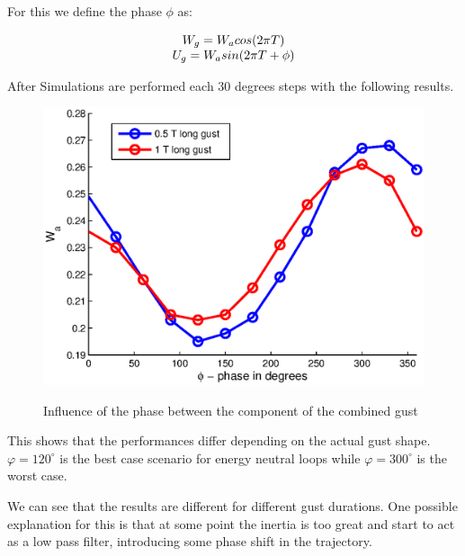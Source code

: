 \par For this we define the phase $\phi$ as:

\begin{equation}
  \begin{array}[c]{c}
    W_g=W_a cos(2\pi T) \\
    U_g=W_a sin(2\pi T + \phi)
  \end{array}
  \label{eqn:combined_gust_phase}
\end{equation}

After Simulations are performed each 30 degrees steps with the following results.

\begin{figure}[ht]
  \begin{center}
    \scalebox{1.0}
    {\includegraphics{./Figures/combined_gust_amplitude_vs_phase_LUT.eps}}
  \end{center}
  \caption{Influence of the phase between the component of the combined gust}
  \label{fig:combined_amplitude_phase}
\end{figure}

\par This shows that the performances differ depending on the actual gust shape.
$\varphi=120^{\circ}$ is the best case scenario for energy neutral loops while $\varphi=300^{\circ}$ is the worst case.

\FloatBarrier

\par We can see that the results are different for different gust durations.
One possible explanation for this is that at some point the inertia is too great and start to act as a low pass filter, introducing some phase shift in the trajectory. 

